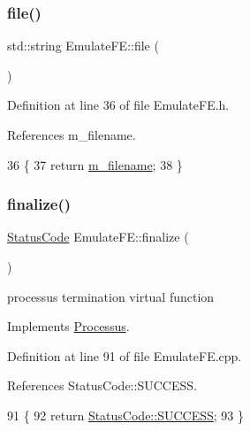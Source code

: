 \subsubsection{\texorpdfstring{file()}{file()}}
{\footnotesize\ttfamily std\+::string Emulate\+F\+E\+::file (\begin{DoxyParamCaption}{ }\end{DoxyParamCaption})\hspace{0.3cm}{\ttfamily [inline]}}



Definition at line 36 of file Emulate\+F\+E.\+h.



References m\+\_\+filename.


\begin{DoxyCode}
36                   \{
37     \textcolor{keywordflow}{return} \hyperlink{classEmulateFE_a103fedea9eb5d3963573f9120cb81a68}{m\_filename};
38   \}
\end{DoxyCode}
\mbox{\label{classEmulateFE_a7d29ee79a606d0f7d337b1e78ef54a03}} 
\subsubsection{\texorpdfstring{finalize()}{finalize()}}
{\footnotesize\ttfamily \hyperlink{classStatusCode}{Status\+Code} Emulate\+F\+E\+::finalize (\begin{DoxyParamCaption}{ }\end{DoxyParamCaption})\hspace{0.3cm}{\ttfamily [virtual]}}

processus termination virtual function 

Implements \hyperlink{classProcessus_aba93d691f031bdb18ae4b8afb1b2e856}{Processus}.



Definition at line 91 of file Emulate\+F\+E.\+cpp.



References Status\+Code\+::\+S\+U\+C\+C\+E\+SS.


\begin{DoxyCode}
91                                  \{
92   \textcolor{keywordflow}{return} \hyperlink{classStatusCode_a6f565cbeadc76d14c72f047e5e85eb4badd0da38d3ba0d922efd1f4619bc37ad8}{StatusCode::SUCCESS};
93 \}
\end{DoxyCode}
\mbox{\label{classEmulateFE_ae62bc56b44c4bcdf7f5eab5cbde2cd69}} 

